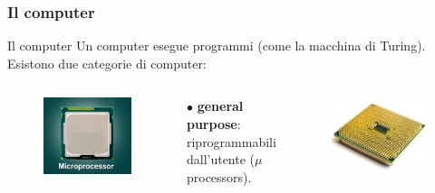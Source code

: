 \begin{frame}
	\frametitle{Il computer}
	
	\begin{block}{Il computer}
		Un computer esegue programmi (come la macchina di Turing).\\
		Esistono due categorie di computer:
		\begin{columns}			
			\begin{figure}[!htbp]
				\centering 
				\includegraphics[width=0.7\linewidth]{images/2_le_architetture/microprocessor.jpeg}
			\end{figure}
			
			$\bullet$ \textbf{general purpose}:\\riprogrammabili dall'utente ($\mu$processors).
			
			\begin{figure}[!htbp]
				\centering
				\advance\leftskip-0.5cm
				\includegraphics[width=1.0\linewidth]{images/2_le_architetture/microprocessor.png}
			\end{figure}
			

\end{columns}
\end{block}
\end{frame}

